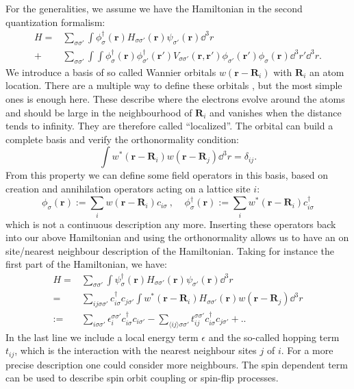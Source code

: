 \documentclass[../main.tex]{subfile}
\begin{document}
For the generalities, we assume we have the Hamiltonian in the second quantization formalism:
\begin{align*}
    H = & \sum_{\sigma\sigma'} \int \phi_{\sigma}^{\dagger}(\bm{r}) H_{\sigma\sigma'}(\bm{r}) \psi_{\sigma'}(\bm{r}) \dd^3r\\
    + & \sum_{\sigma\sigma'} \int \int \phi_{\sigma}^{\dagger}(\bm{r})\phi_{\sigma'}^{\dagger}(\bm{r}') V_{\sigma\sigma'}(\bm{r},\bm{r}')
     \phi_{\sigma'}(\bm{r}')\phi_{\sigma}(\bm{r}) \dd^3r'\dd^3r.
\end{align*}
We introduce a basis of so called Wannier orbitals $w(\bm{r} - \bm{R}_i)$ with $\bm{R}_i$ an atom location. There are a multiple way to define these orbitals \cite{Marzari},
but the most simple ones \cite{Wannier1937} is enough here. These describe where the electrons evolve around the atoms and should be large
 in the neighbourhood of $\bm{R}_i$ and vanishes when the distance tends to infinity.
They are therefore called ``localized''. The orbital can build a complete basis and verify the orthonormality condition:
\[
    \int w^{\ast}(\bm{r} - \bm{R}_i) w(\bm{r} - \bm{R}_j) \dd^3r = \delta_{ij}.
\]
From this property we can define some field operators in this basis, based on creation and annihilation operators acting on a lattice site $i$:
\begin{equation}\label{eq:Wannier_fieldOp}
    \phi_{\sigma}(\bm{r}) := \sum_{i} w(\bm{r} - \bm{R}_i) c_{i\sigma} ~,~~~~~ \phi_{\sigma}^{\dagger}(\bm{r}) := \sum_{i} w^{\ast}(\bm{r} - \bm{R}_i) c_{i\sigma}^{\dagger}
\end{equation}
which is not a continuous description any more. 
Inserting these operators back into our above Hamiltonian and using the orthonormality allows us to have an on site/nearest neighbour description of the Hamiltonian. Taking for
instance the first part of the Hamiltonian, we have:
\begin{align*}
    H = & \sum_{\sigma\sigma'} \int \psi_{\sigma}^{\dagger}(\bm{r}) H_{\sigma\sigma'}(\bm{r}) \psi_{\sigma'}(\bm{r}) \dd^3r\\
    =& \sum_{ij\sigma\sigma'} c_{i\sigma}^{\dagger} c_{j\sigma'}\int w^{\ast}(\bm{r} - \bm{R}_i) H_{\sigma\sigma'}(\bm{r}) w(\bm{r} - \bm{R}_j) \dd^3r\\
    := & \sum_{i\sigma\sigma'} \epsilon_i^{\sigma\sigma'} c_{i\sigma}^{\dagger} c_{i\sigma'} - \sum_{\langle ij\rangle\sigma\sigma'} t_{ij}^{\sigma\sigma'} c_{i\sigma}^{\dagger} c_{j\sigma'} + ..   
\end{align*}
In the last line we include a local energy term $\epsilon$ and the so-called hopping term $t_{ij}$, which is the interaction with the nearest neighbour sites $j$ of $i$.
For a more precise description one could consider more neighbours. The spin dependent term can be used to describe spin orbit coupling or spin-flip processes.\\
\end{document}
